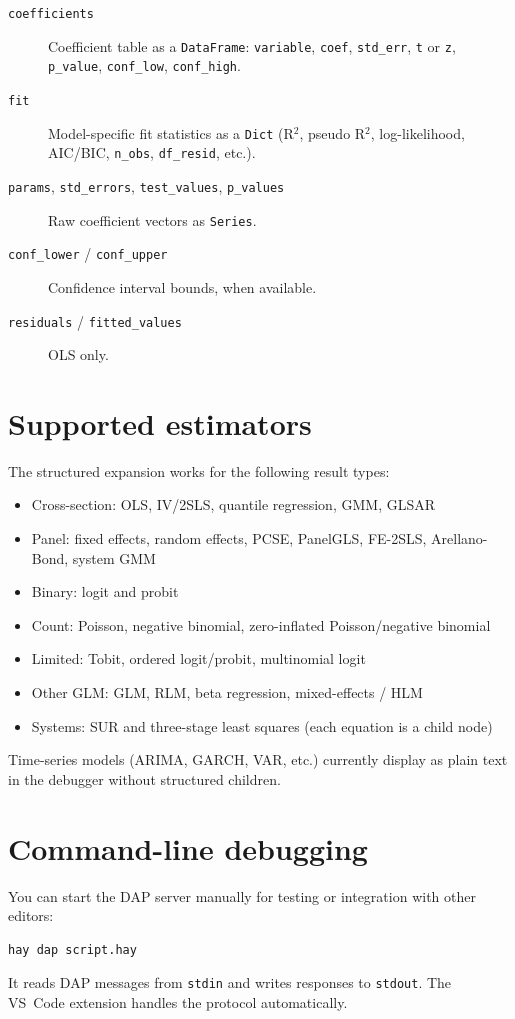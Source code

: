 \begin{description}
  \item[\texttt{coefficients}] Coefficient table as a \texttt{DataFrame}: \texttt{variable}, \texttt{coef}, \texttt{std\_err}, \texttt{t} or \texttt{z}, \texttt{p\_value}, \texttt{conf\_low}, \texttt{conf\_high}.
  \item[\texttt{fit}] Model-specific fit statistics as a \texttt{Dict} (R$^2$, pseudo R$^2$, log-likelihood, AIC/BIC, \texttt{n\_obs}, \texttt{df\_resid}, etc.).
  \item[\texttt{params}, \texttt{std\_errors}, \texttt{test\_values}, \texttt{p\_values}] Raw coefficient vectors as \texttt{Series}.
  \item[\texttt{conf\_lower} / \texttt{conf\_upper}] Confidence interval bounds, when available.
  \item[\texttt{residuals} / \texttt{fitted\_values}] OLS only.
\end{description}

\section{Supported estimators}

The structured expansion works for the following result types:

\begin{itemize}
  \item Cross-section: OLS, IV/2SLS, quantile regression, GMM, GLSAR
  \item Panel: fixed effects, random effects, PCSE, PanelGLS, FE-2SLS, Arellano-Bond, system GMM
  \item Binary: logit and probit
  \item Count: Poisson, negative binomial, zero-inflated Poisson/negative binomial
  \item Limited: Tobit, ordered logit/probit, multinomial logit
  \item Other GLM: GLM, RLM, beta regression, mixed-effects / HLM
  \item Systems: SUR and three-stage least squares (each equation is a child node)
\end{itemize}

\begin{nota}
  Time-series models (ARIMA, GARCH, VAR, etc.) currently display as plain text in the debugger without structured children.
\end{nota}

\section{Command-line debugging}

You can start the DAP server manually for testing or integration with other editors:

\begin{lstlisting}[style=inline, language=sh]
hay dap script.hay
\end{lstlisting}

It reads DAP messages from \texttt{stdin} and writes responses to \texttt{stdout}. The VS~Code extension handles the protocol automatically.
